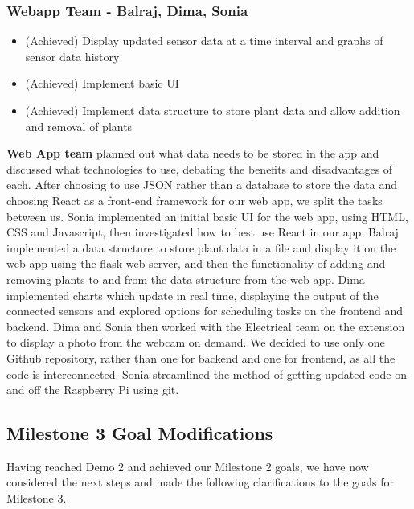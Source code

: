\documentclass{article}
\begin{document}
\subsubsection{\textbf{Webapp Team -  Balraj, Dima, Sonia}}
\vspace{3mm}
\begin{itemize}
    \vspace{-3mm}
    \setlength{\itemsep}{0pt}%
    \setlength{\parskip}{0pt}
    \item (Achieved) Display updated sensor data at a time interval and graphs of sensor data history
    \item (Achieved) Implement basic UI
    \item (Achieved) Implement data structure to store plant data and allow addition and removal of plants
\end{itemize}
\textbf{Web App team} planned out what data needs to be stored in the app and discussed what technologies to use, debating the benefits and disadvantages of each. After choosing to use JSON rather than a database to store the data and choosing React as a front-end framework for our web app, we split the tasks between us. Sonia implemented an initial basic UI for the web app, using HTML, CSS and Javascript, then investigated how to best use React in our app. Balraj implemented a data structure to store plant data in a file and display it on the web app using the flask web server, and then the functionality of adding and removing plants to and from the data structure from the web app. Dima implemented charts which update in real time, displaying the output of the connected sensors and explored options for scheduling tasks on the frontend and backend. Dima and Sonia then worked with the Electrical team on the extension to display a photo from the webcam on demand. We decided to use only one Github repository, rather than one for backend and one for frontend, as all the code is interconnected. Sonia streamlined the method of getting updated code on and off the Raspberry Pi using git.

\subsection{Milestone 3 Goal Modifications}
Having reached Demo 2 and achieved our Milestone 2 goals, we have now considered the next steps and made the following clarifications to the goals for Milestone 3.
\end{document}
